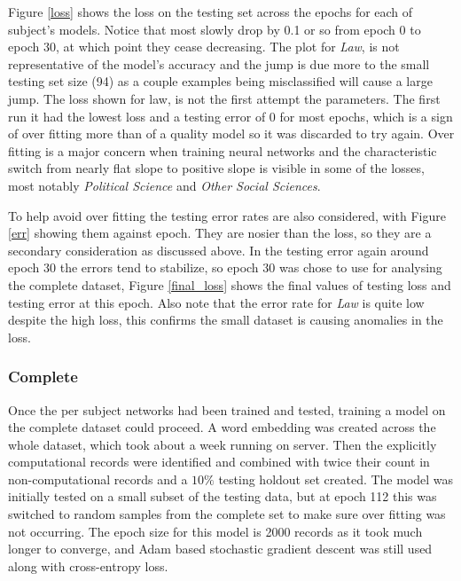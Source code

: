 \documentclass[12pt, a4paper]{article}
\begin{document}
Figure \ref{loss} shows the loss on the testing set across the epochs for each of subject's models. Notice that most slowly drop by \num{0.1} or so from epoch 0 to epoch 30, at which point they cease decreasing. The plot for \textit{Law}, is not representative of the model's accuracy and the jump is due more to the small testing set size (94) as a couple examples being misclassified will cause a large jump. The loss shown for law, is not the first attempt the parameters. The first run it had the lowest loss and a testing error of 0 for most epochs, which is a sign of over fitting more than of a quality model so it was discarded to try again. Over fitting is a major concern when training neural networks \citep{james2013introduction} and the characteristic switch from nearly flat slope to positive slope is visible in some of the losses, most notably \textit{Political Science} and \textit{Other Social Sciences}.

To help avoid over fitting the testing error rates are also considered, with Figure \ref{err} showing them against epoch. They are nosier than the loss, so they are a secondary consideration as discussed above. In the testing error again around epoch 30 the errors tend to stabilize, so epoch 30 was chose to use for analysing the complete dataset, Figure \ref{final_loss} shows the final values of testing loss and testing error at this epoch. Also note that the error rate for \textit{Law} is quite low despite the high loss, this confirms the small dataset is causing anomalies in the loss.

\subsubsection{Complete}

Once the per subject networks had been trained and tested, training a model on the complete dataset could proceed. A word embedding was created across the whole dataset, which took about a week running on server. Then the explicitly computational records were identified and combined with twice their count in non-computational records and a $10\%$ testing holdout set created. The model was initially tested on a small subset of the testing data, but at epoch 112 this was switched to random samples from the complete set to make sure over fitting was not occurring. The epoch size for this model is 2000 records as it took much longer to converge, and Adam based stochastic gradient descent was still used along with cross-entropy loss. 
\end{document}
